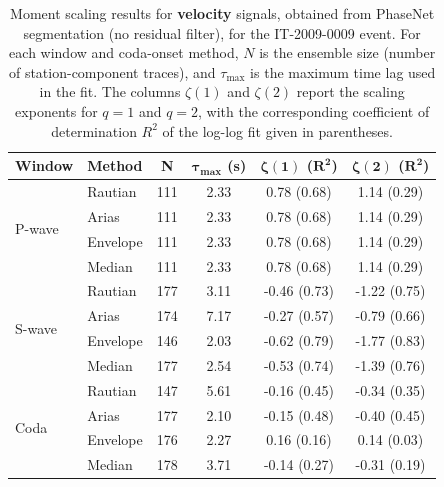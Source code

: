 \begin{table}[H]
\centering
\small
\begin{tabular}{llcccc}
\toprule
\textbf{Window} & \textbf{Method} & \textbf{N} & $\bm{\tau_{\max}}$ \textbf{(s)} & $\bm{\zeta(1)}$ \textbf{(}$\bm{R^2}$\textbf{)} & $\bm{\zeta(2)}$ \textbf{(}$\bm{R^2}$\textbf{)} \\
\midrule
\multirow{4}{*}{P-wave}
& Rautian & 111 & 2.33 & 0.78 (0.68) & 1.14 (0.29) \\
& Arias & 111 & 2.33 & 0.78 (0.68) & 1.14 (0.29) \\
& Envelope & 111 & 2.33 & 0.78 (0.68) & 1.14 (0.29) \\
& Median & 111 & 2.33 & 0.78 (0.68) & 1.14 (0.29) \\
\midrule
\multirow{4}{*}{S-wave}
& Rautian & 177 & 3.11 & -0.46 (0.73) & -1.22 (0.75) \\
& Arias & 174 & 7.17 & -0.27 (0.57) & -0.79 (0.66) \\
& Envelope & 146 & 2.03 & -0.62 (0.79) & -1.77 (0.83) \\
& Median & 177 & 2.54 & -0.53 (0.74) & -1.39 (0.76) \\
\midrule
\multirow{4}{*}{Coda}
& Rautian & 147 & 5.61 & -0.16 (0.45) & -0.34 (0.35) \\
& Arias & 177 & 2.10 & -0.15 (0.48) & -0.40 (0.45) \\
& Envelope & 176 & 2.27 & 0.16 (0.16) & 0.14 (0.03) \\
& Median & 178 & 3.71 & -0.14 (0.27) & -0.31 (0.19) \\
\bottomrule
\end{tabular}
\caption{Moment scaling results for \textbf{velocity} signals, obtained from PhaseNet segmentation (no residual filter), for the IT-2009-0009 event. For each window and coda-onset method, $N$ is the ensemble size (number of station-component traces), and $\tau_{\max}$ is the maximum time lag used in the fit. The columns $\zeta(1)$ and $\zeta(2)$ report the scaling exponents for $q=1$ and $q=2$, with the corresponding coefficient of determination $R^2$ of the log-log fit given in parentheses.}
\label{tab:phasenet_scaling_vel_nothresh_laquila}
\end{table}